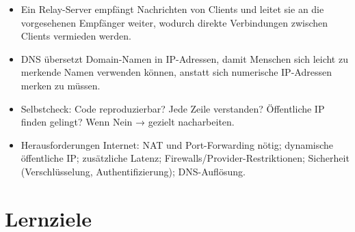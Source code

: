 \begin{myexercise}
\begin{myanswer}
\begin{itemize}
    \item Ein Relay-Server empfängt Nachrichten von Clients und leitet sie an die vorgesehenen Empfänger weiter, wodurch direkte Verbindungen zwischen Clients vermieden werden.
    \item DNS übersetzt Domain-Namen in IP-Adressen, damit Menschen sich leicht zu merkende Namen verwenden können, anstatt sich numerische IP-Adressen merken zu müssen.
    \item Selbstcheck: Code reproduzierbar? Jede Zeile verstanden? Öffentliche IP finden gelingt? Wenn Nein → gezielt nacharbeiten.
    \item Herausforderungen Internet: NAT und Port-Forwarding nötig; dynamische öffentliche IP; zusätzliche Latenz; Firewalls/Provider-Restriktionen; Sicherheit (Verschlüsselung, Authentifizierung); DNS-Auflösung.
\end{itemize}
\end{myanswer}
\end{myexercise}



\chapter{Lernziele}

